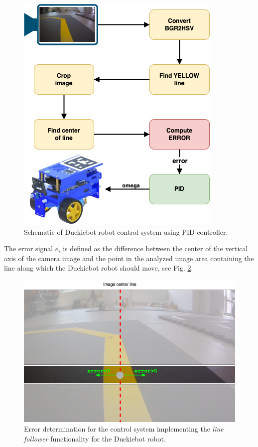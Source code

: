 \documentclass[conference]{IEEEtran}
\begin{document}
\begin{figure}[h]
    \centering
    \includegraphics[width=.8\columnwidth]{PipeLinePID}
    \caption{Schematic of Duckiebot robot control system using PID controller.}
    \label{fig:pid-pipeline}
\end{figure}

The error signal $e_i$ is defined as the difference between the center of the vertical axis of the camera image and the point in the analyzed image area containing the line along which the Duckiebot robot should move, see Fig. \ref{fig:error-definition}. 

\begin{figure}[h]
    \centering
    \includegraphics[width=.95\columnwidth]{ErrorDefinition.png}
    \caption{Error determination for the control system implementing the \emph{line follower} functionality for the Duckiebot robot.}
    \label{fig:error-definition}
\end{figure}
\end{document}
